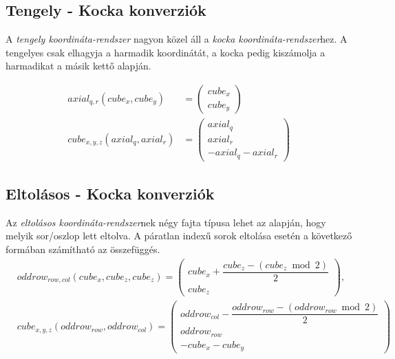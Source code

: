 \subsection{Tengely - Kocka konverziók}

A \textit{tengely koordináta-rendszer} nagyon közel áll a \textit{kocka koordináta-rendszer}hez. A tengelyes csak elhagyja a harmadik koordinátát, a kocka pedig kiszámolja a harmadikat a másik kettő alapján.


\begin{align*}
axial_{q, r}(cube_{x}, cube_{y}) &=
\left(
\begin{array}{c}
cube_{x} \\
cube_{y}
\end{array}
\right)
\\
cube_{x,y,z} (axial_{q}, axial_{r}) &=
\left(
\begin{array}{c}
axial_q \\
axial_r \\
-axial_q - axial_r
\end{array}
\right)
\end{align*}

\subsection{Eltolásos - Kocka konverziók}

Az \textit{eltolásos koordináta-rendszer}nek négy fajta típusa lehet az alapján, hogy melyik sor/oszlop lett eltolva. A páratlan indexű sorok eltolása esetén a következő formában számítható az összefüggés.
\begin{align*}
&oddrow_{row, col}(cube_{x},cube_{z}, cube_{z}) =
\left(
\begin{array}{c}
cube_{x} + \dfrac{cube_{z} - (cube_{z} \bmod 2)}{2} \\
cube_{z}
\end{array}
\right),
\\
&cube_{x, y, z}(oddrow_{row}, oddrow_{col}) =
\left(
\begin{array}{c}
oddrow_{col} - \dfrac{oddrow_{row} - (oddrow_{row} \bmod 2)}{2} \\
oddrow_{row} \\
-cube_{x} - cube_{y}
\end{array}
\right)
\end{align*}

